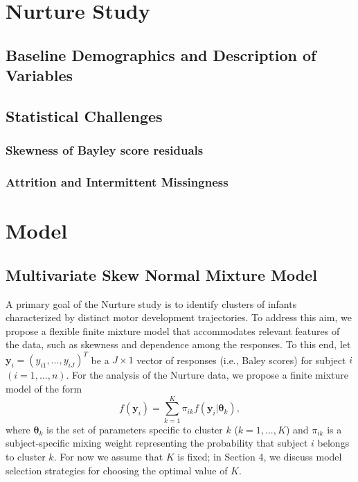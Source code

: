 \documentclass[useAMS,referee]{biom}
\begin{document}
\newpage

\section{Nurture Study}
\label{s:nurt}
\subsection{Baseline Demographics and Description of Variables}

\subsection{Statistical Challenges}
\subsubsection{Skewness of Bayley score residuals}
\subsubsection{Attrition and Intermittent Missingness}

\newpage

\section{Model}
\label{s:model}

\subsection{Multivariate Skew Normal Mixture Model}

A primary goal of the Nurture study is to identify clusters of infants characterized by distinct motor development trajectories. To address this aim, we propose a flexible finite mixture model that accommodates relevant features of the data, such as skewness and dependence among the responses. To this end, let $\mathbf{y}_{i}=(y_{i1},\ldots,y_{iJ})^T$ be a $J \times 1$ vector of responses (i.e., Baley scores) for subject $i$ $(i=1,\ldots,n)$. For the analysis of the Nurture data, we propose a finite mixture model of the form
\begin{equation}
f(\mathbf{y}_i) = \sum_{k = 1}^{K} \pi_{ik} f(\mathbf{y}_i|\boldsymbol\theta_k),
\end{equation}
where $\boldsymbol\theta_k$ is the set of parameters specific to cluster $k$ ($k = 1,...,K$) and $\pi_{ik}$ is a subject-specific mixing weight representing the probability that subject $i$ belongs to cluster $k$. For now we assume that $K$ is fixed; in Section 4, we discuss model selection strategies for choosing the optimal value of $K$. 
\end{document}
